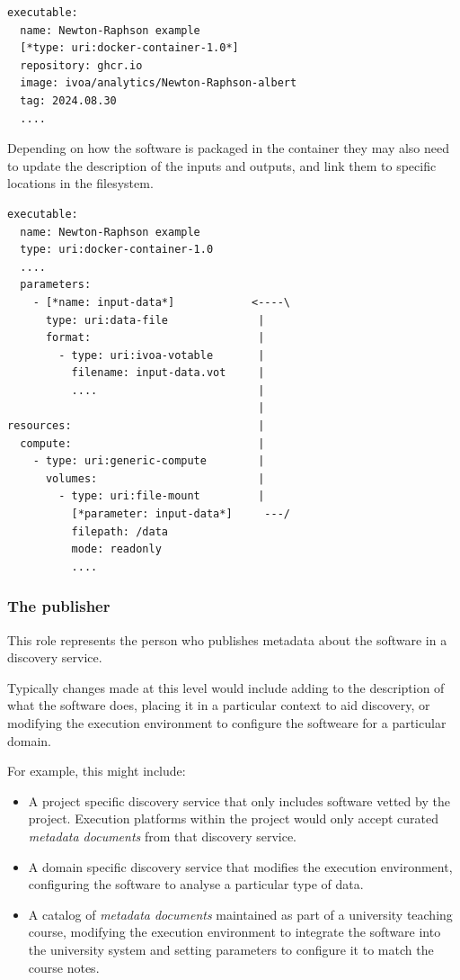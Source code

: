 \documentclass[11pt,a4paper]{ivoa}
\newcommand{\metadoc} [1]{\textit{metadata document#1}}
\begin{document}
\begin{lstlisting}[]
executable:
  name: Newton-Raphson example
  [*type: uri:docker-container-1.0*]
  repository: ghcr.io
  image: ivoa/analytics/Newton-Raphson-albert
  tag: 2024.08.30
  ....
\end{lstlisting}

Depending on how the software is packaged in the container they may also need to update
the description of the inputs and outputs, and link them to specific locations in the
filesystem.

\begin{lstlisting}[]
executable:
  name: Newton-Raphson example
  type: uri:docker-container-1.0
  ....
  parameters:
    - [*name: input-data*]            <----\
      type: uri:data-file              |
      format:                          |
        - type: uri:ivoa-votable       |
          filename: input-data.vot     |
          ....                         |
                                       |
resources:                             |
  compute:                             |
    - type: uri:generic-compute        |
      volumes:                         |
        - type: uri:file-mount         |
          [*parameter: input-data*]     ---/
          filepath: /data
          mode: readonly
          ....
\end{lstlisting}

\subsubsection{The publisher}
\label{metadata-publisher}

This role represents the person who publishes metadata about the software in a discovery service.

Typically changes made at this level would include adding to the description
of what the software does, placing it in a particular context to aid discovery,
or modifying the execution environment to configure the softweare for a particular domain.

For example, this might include:

\begin{itemize}
    \item A project specific discovery service that only includes software vetted by the project.
          Execution platforms within the project would only accept curated \metadoc{s}
          from that discovery service.
    \item A domain specific discovery service that modifies the execution environment, configuring
          the software to analyse a particular type of data.
    \item A catalog of \metadoc{s} maintained as part of a university teaching course, modifying the
          execution environment to integrate the software into the university system and setting
          parameters to configure it to match the course notes.
\end{itemize}
\end{document}
